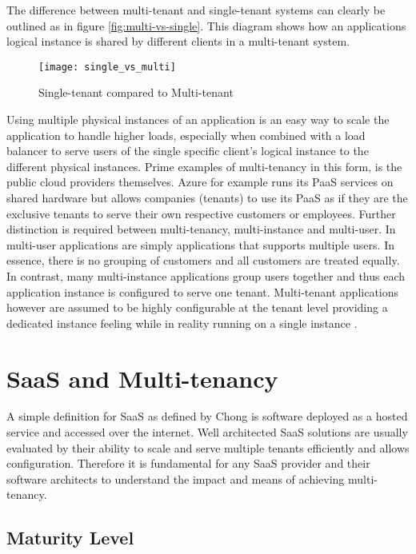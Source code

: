 The difference between multi-tenant and single-tenant systems can clearly be outlined as in figure \ref{fig:multi-vs-single}. This diagram shows how an applications logical instance is shared by different clients in a multi-tenant system.

\begin{figure}
\centering
\texttt{[image: single\_vs\_multi]}
\caption{Single-tenant compared to Multi-tenant}
\label{fig:single_vs_multi}
\end{figure}

Using multiple physical instances of an application is an easy way to scale the application to handle higher loads, especially when combined with a load balancer to serve users of the single specific client's logical instance to the different physical instances. Prime examples of multi-tenancy in this form, is the public cloud providers themselves. Azure for example runs its PaaS services on shared hardware but allows companies (tenants) to use its PaaS as if they are the exclusive tenants to serve their own respective customers or employees.
Further distinction is required between multi-tenancy, multi-instance and multi-user. In multi-user applications are simply applications that supports multiple users. In essence, there is no grouping of customers and all customers are treated equally\cite{Bezemer:2010:MSA:1862372.1862393}. In contrast, many multi-instance applications group users together and thus each application instance is configured to serve one tenant. Multi-tenant applications however are assumed to be highly configurable at the tenant level providing a dedicated instance feeling while in reality running on a single instance \cite{Bezemer:2010:MSA:1862372.1862393}.

\section{SaaS and Multi-tenancy}

A simple definition for SaaS as defined by Chong \cite{Chong2006} is software deployed as a hosted service and accessed over the internet. Well architected SaaS solutions are usually evaluated by their ability to scale and serve multiple tenants efficiently and allows configuration. Therefore it is fundamental for any SaaS provider and their software architects to understand the impact and means of achieving multi-tenancy.

\subsection{Maturity Level}

